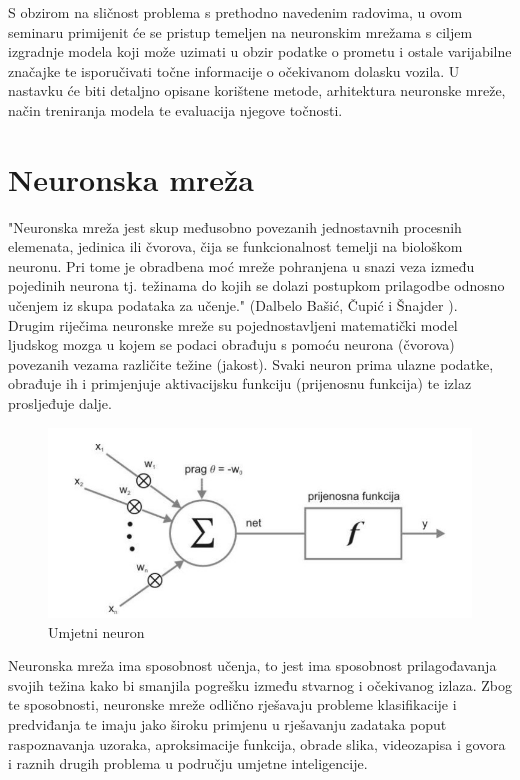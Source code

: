 \documentclass[seminarskirad]{fer}
\begin{document}
S obzirom na sličnost problema s prethodno navedenim radovima, u ovom seminaru primijenit će se pristup temeljen na neuronskim mrežama s ciljem izgradnje modela koji može uzimati u obzir podatke o prometu i ostale varijabilne značajke te isporučivati točne informacije o očekivanom dolasku vozila. U nastavku će biti detaljno opisane korištene metode, arhitektura neuronske mreže, način treniranja modela te evaluacija njegove točnosti.

\section{Neuronska mreža}
\label{pog:neuronska}
"Neuronska mreža jest skup međusobno povezanih jednostavnih procesnih elemenata, jedinica ili čvorova, čija se funkcionalnost temelji na biološkom neuronu. Pri tome je obradbena moć mreže pohranjena u snazi veza između pojedinih neurona tj. težinama do kojih se dolazi postupkom prilagodbe odnosno učenjem iz skupa podataka za učenje."
(Dalbelo Bašić, Čupić i Šnajder \cite{ferumjetne}). \\Drugim riječima neuronske mreže su pojednostavljeni matematički model ljudskog mozga u kojem se podaci obrađuju s pomoću neurona (čvorova) povezanih vezama različite težine (jakost). Svaki neuron prima ulazne podatke, obrađuje ih i primjenjuje aktivacijsku funkciju (prijenosnu funkcija) te izlaz prosljeđuje dalje.

\begin{figure}[htb]
	\centering
	\includegraphics[width=0.65\linewidth]{Figures/neuron.jpg} 
	\caption{Umjetni neuron \cite{ferumjetne}}
	\label{slk:neuron}
\end{figure}

Neuronska mreža ima sposobnost učenja, to jest ima sposobnost prilagođavanja svojih težina kako bi smanjila pogrešku između stvarnog i očekivanog izlaza. Zbog te sposobnosti, neuronske mreže odlično rješavaju probleme klasifikacije i predviđanja te imaju jako široku primjenu u rješavanju zadataka poput raspoznavanja uzoraka, aproksimacije funkcija, obrade slika, videozapisa i govora i raznih drugih problema u području umjetne inteligencije.\\
\pagebreak
\end{document}
